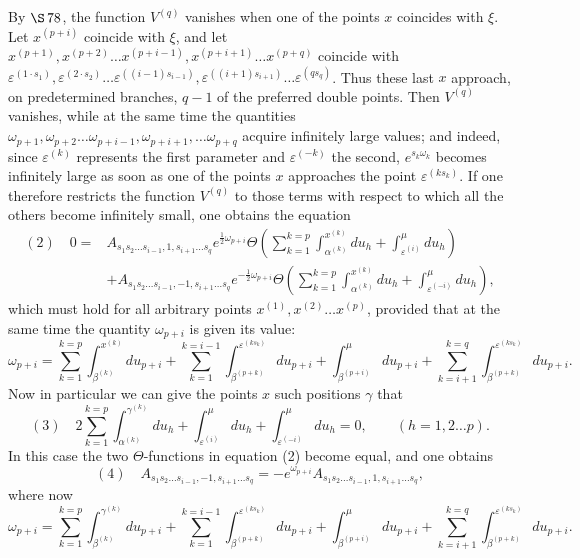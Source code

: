 \documentclass[10pt]{article}
\begin{document}
By \(\S\,78\), the function \(V^{(q)}\) vanishes when one of the points \(x\) coincides with \(\xi\). Let \(x^{(p+i)}\) coincide with \(\xi\), and let \(x^{(p+1)},x^{(p+2)}\ldots x^{(p+i-1)},x^{(p+i+1)}\ldots x^{(p+q)}\) coincide with \(\varepsilon^{(1\cdot s_1)},\varepsilon^{(2\cdot s_2)}\ldots\varepsilon^{((i-1)s_{i-1})},\varepsilon^{((i+1)s_{i+1})}\ldots\varepsilon^{(qs_q)}\). Thus these last \(x\) approach, on predetermined branches, \(q-1\) of the preferred double points. Then \(V^{(q)}\) vanishes, while at the same time the quantities \(\omega_{p+1},\omega_{p+2}\ldots\omega_{p+i-1},\omega_{p+i+1},\ldots\omega_{p+q}\) acquire infinitely large values; and indeed, since \(\varepsilon^{(k)}\) represents the first parameter and \(\varepsilon^{(-k)}\) the second, \(e^{s_k\omega_k}\) becomes infinitely large as soon as one of the points \(x\) approaches the point \(\varepsilon^{(ks_k)}\). If one therefore restricts the function \(V^{(q)}\) to those terms with respect to which all the others become infinitely small, one obtains the equation
\[
\begin{aligned}
(2)\quad 0={}&A_{s_1s_2\ldots s_{i-1},1,s_{i+1}\ldots s_q}
 e^{\frac12\omega_{p+i}}
 \Theta\left(\sum_{k=1}^{k=p}\int_{\alpha^{(k)}}^{x^{(k)}}du_h+
 \int_{\varepsilon^{(i)}}^{\mu}du_h\right)\\
&+A_{s_1s_2\ldots s_{i-1},-1,s_{i+1}\ldots s_q}
 e^{-\frac12\omega_{p+i}}
 \Theta\left(\sum_{k=1}^{k=p}\int_{\alpha^{(k)}}^{x^{(k)}}du_h+
 \int_{\varepsilon^{(-i)}}^{\mu}du_h\right),
\end{aligned}
\]
which must hold for all arbitrary points \(x^{(1)},x^{(2)}\ldots x^{(p)}\), provided that at the same time the quantity \(\omega_{p+i}\) is given its value:
\[
\omega_{p+i}=\sum_{k=1}^{k=p}\int_{\beta^{(k)}}^{x^{(k)}}du_{p+i}
+\sum_{k=1}^{k=i-1}\int_{\beta^{(p+k)}}^{\varepsilon^{(ks_k)}}du_{p+i}
+\int_{\beta^{(p+i)}}^{\mu}du_{p+i}
+\sum_{k=i+1}^{k=q}\int_{\beta^{(p+k)}}^{\varepsilon^{(ks_k)}}du_{p+i}.
\]
Now in particular we can give the points \(x\) such positions \(\gamma\) that
\[
(3)\quad
2\sum_{k=1}^{k=p}\int_{\alpha^{(k)}}^{\gamma^{(k)}}du_h+
\int_{\varepsilon^{(i)}}^{\mu}du_h+
\int_{\varepsilon^{(-i)}}^{\mu}du_h=0,
\qquad (h=1,2\ldots p).
\]
In this case the two \(\Theta\)-functions in equation (2) become equal, and one obtains
\[
(4)\quad
A_{s_1s_2\ldots s_{i-1},-1,s_{i+1}\ldots s_q}
=-e^{\omega_{p+i}}A_{s_1s_2\ldots s_{i-1},1,s_{i+1}\ldots s_q},
\]
where now
\[
\omega_{p+i}=\sum_{k=1}^{k=p}\int_{\beta^{(k)}}^{\gamma^{(k)}}du_{p+i}
+\sum_{k=1}^{k=i-1}\int_{\beta^{(p+k)}}^{\varepsilon^{(ks_k)}}du_{p+i}
+\int_{\beta^{(p+i)}}^{\mu}du_{p+i}
+\sum_{k=i+1}^{k=q}\int_{\beta^{(p+k)}}^{\varepsilon^{(ks_k)}}du_{p+i}.
\tag{5}
\]
\end{document}
